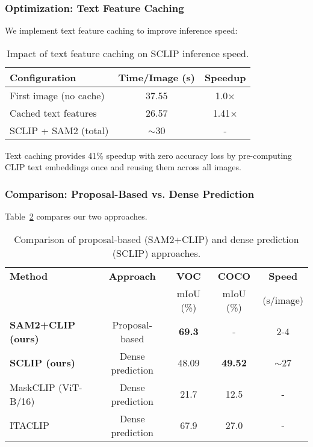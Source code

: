 \subsubsection{Optimization: Text Feature Caching}

We implement text feature caching to improve inference speed:

\begin{table}[h]
\centering
\caption{Impact of text feature caching on SCLIP inference speed.}
\label{tab:sclip_caching}
\begin{tabular}{lcc}
\hline
\textbf{Configuration} & \textbf{Time/Image (s)} & \textbf{Speedup} \\
\hline
First image (no cache) & 37.55 & 1.0$\times$ \\
Cached text features & 26.57 & 1.41$\times$ \\
SCLIP + SAM2 (total) & $\sim$30 & - \\
\hline
\end{tabular}
\end{table}

Text caching provides 41\% speedup with zero accuracy loss by pre-computing CLIP text embeddings once and reusing them across all images.

\subsubsection{Comparison: Proposal-Based vs. Dense Prediction}

Table~\ref{tab:method_comparison} compares our two approaches.

\begin{table}[h]
\centering
\caption{Comparison of proposal-based (SAM2+CLIP) and dense prediction (SCLIP) approaches.}
\label{tab:method_comparison}
\begin{tabular}{lcccc}
\hline
\textbf{Method} & \textbf{Approach} & \textbf{VOC} & \textbf{COCO} & \textbf{Speed} \\
 & & mIoU (\%) & mIoU (\%) & (s/image) \\
\hline
\textbf{SAM2+CLIP (ours)} & Proposal-based & \textbf{69.3} & - & 2-4 \\
\textbf{SCLIP (ours)} & Dense prediction & 48.09 & \textbf{49.52} & $\sim$27 \\
\hline
MaskCLIP (ViT-B/16) & Dense prediction & 21.7 & 12.5 & - \\
ITACLIP & Dense prediction & 67.9 & 27.0 & - \\
\hline
\end{tabular}
\end{table}


